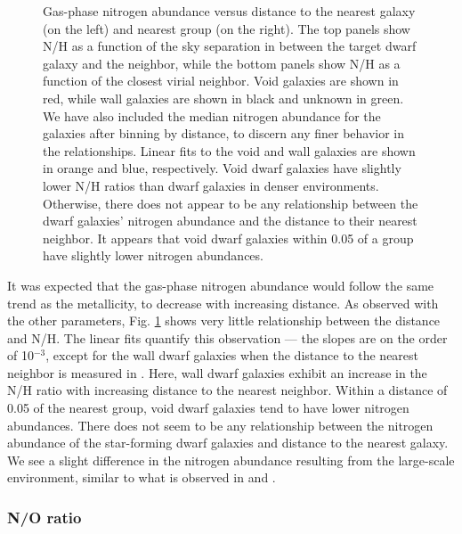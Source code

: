 \begin{figure}
    \caption[N/H versus distance to nearest neighbor and group]{Gas-phase 
    nitrogen abundance versus distance to the nearest galaxy (on the left) and 
    nearest group (on the right).  The top panels show N/H as a function of the 
    sky separation in \hMpc between the target dwarf galaxy and the neighbor, 
    while the bottom panels show N/H as a function of the closest virial 
    neighbor.  Void galaxies are shown in red, while wall galaxies are shown in 
    black and unknown in green.  We have also included the median nitrogen 
    abundance for the galaxies after binning by distance, to discern any finer 
    behavior in the relationships.  Linear fits to the void and wall galaxies 
    are shown in orange and blue, respectively.  Void dwarf galaxies have 
    slightly lower N/H ratios than dwarf galaxies in denser environments.  
    Otherwise, there does not appear to be any relationship between the dwarf 
    galaxies' nitrogen abundance and the distance to their nearest neighbor.  It 
    appears that void dwarf galaxies within 0.05 \hMpc of a group have slightly 
    lower nitrogen abundances.}
    \label{fig:NH}
\end{figure}

It was expected that the gas-phase nitrogen abundance would follow the same 
trend as the metallicity, to decrease with increasing distance.  As observed 
with the other parameters, Fig. \ref{fig:NH} shows very little relationship 
between the distance and N/H.  The linear fits quantify this observation --- the 
slopes are on the order of 10$^{-3}$, except for the wall dwarf galaxies when 
the distance to the nearest neighbor is measured in \hMpc.  Here, wall dwarf 
galaxies exhibit an increase in the N/H ratio with increasing distance to the 
nearest neighbor.  Within a distance of 0.05 \hMpc of the nearest group, void 
dwarf galaxies tend to have lower nitrogen abundances.  There does not seem to 
be any relationship between the nitrogen abundance of the star-forming dwarf 
galaxies and distance to the nearest galaxy.  We see a slight difference in the 
nitrogen abundance resulting from the large-scale environment, similar to what 
is observed in \cite{Douglass17b} and \cite{Douglass17c}.


\subsubsection{N/O ratio}

